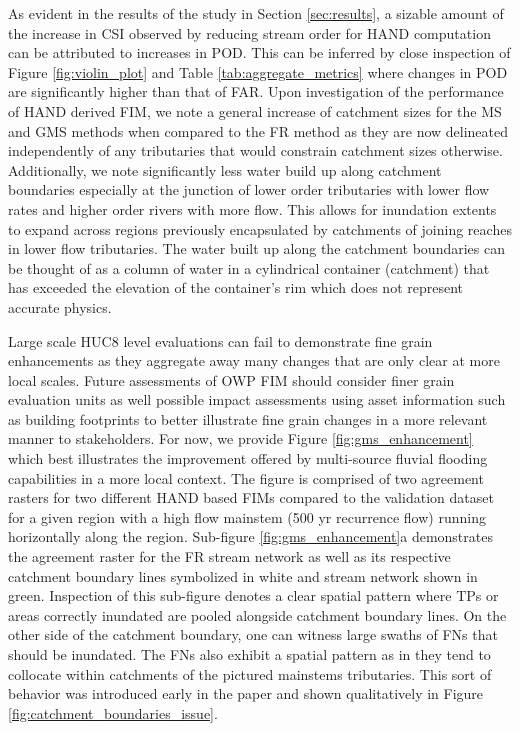 \documentclass[draft]{dependencies/agujournal2019}
\begin{document}
As evident in the results of the study in Section \ref{sec:results}, a sizable amount of the increase in CSI observed by reducing stream order for HAND computation can be attributed to increases in POD.
This can be inferred by close inspection of Figure \ref{fig:violin_plot} and Table \ref{tab:aggregate_metrics} where changes in POD are significantly higher than that of FAR.
Upon investigation of the performance of HAND derived FIM, we note a general increase of catchment sizes for the MS and GMS methods when compared to the FR method as they are now delineated independently of any tributaries that would constrain catchment sizes otherwise.
Additionally, we note significantly less water build up along catchment boundaries especially at the junction of lower order tributaries with lower flow rates and higher order rivers with more flow.
This allows for inundation extents to expand across regions previously encapsulated by catchments of joining reaches in lower flow tributaries.
The water built up along the catchment boundaries can be thought of as a column of water in a cylindrical container (catchment) that has exceeded the elevation of the container's rim which does not represent accurate physics.

Large scale HUC8 level evaluations can fail to demonstrate fine grain enhancements as they aggregate away many changes that are only clear at more local scales.
Future assessments of OWP FIM should consider finer grain evaluation units as well possible impact assessments using asset information such as building footprints to better illustrate fine grain changes in a more relevant manner to stakeholders.
For now, we provide Figure \ref{fig:gms_enhancement} which best illustrates the improvement offered by multi-source fluvial flooding capabilities in a more local context.
The figure is comprised of two agreement rasters for two different HAND based FIMs compared to the validation dataset for a given region with a high flow mainstem (500 yr recurrence flow) running horizontally along the region.
Sub-figure \ref{fig:gms_enhancement}a demonstrates the agreement raster for the FR stream network as well as its respective catchment boundary lines symbolized in white and stream network shown in green.
Inspection of this sub-figure denotes a clear spatial pattern where TPs or areas correctly inundated are pooled alongside catchment boundary lines. 
On the other side of the catchment boundary, one can witness large swaths of FNs that should be inundated. 
The FNs also exhibit a spatial pattern as in they tend to collocate within catchments of the pictured mainstems tributaries.
This sort of behavior was introduced early in the paper and shown qualitatively in Figure \ref{fig:catchment_boundaries_issue}.
\end{document}
